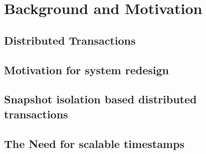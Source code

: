 \section{Background and Motivation}
\subsection{Distributed Transactions}


\subsection{Motivation for system redesign}


\subsection{Snapshot isolation based distributed transactions}



\subsection{The Need for scalable timestamps}
